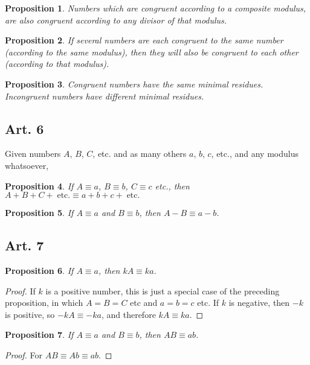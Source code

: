 \documentclass{book}
\theoremstyle{plain}
\newtheorem{proposition}{Proposition}
\theoremstyle{remark}
\begin{document}
\begin{proposition} Numbers which are congruent according to a composite modulus, are also congruent according to any divisor of that modulus. \end{proposition}

\begin{proposition} If several numbers are each congruent to the same number (according to the same modulus), then they will also be congruent to each other (according to that modulus). \end{proposition}

\begin{proposition}  Congruent numbers have the same minimal residues.  Incongruent numbers have different minimal residues. \end{proposition}

\subsection*{Art. 6} Given numbers $A$, $B$, $C$, etc. and as many others $a$, $b$, $c$, etc., and any modulus whatsoever, 
\begin{proposition} If  $A \equiv a$, $B \equiv b$, $C \equiv c$ etc.,  then $A + B + C + \;\mathrm{etc.} \equiv a+b+c+\;\mathrm{etc.} $ \end{proposition}
\begin{proposition}If  $A \equiv a$ and $B \equiv b$, then $ A - B  \equiv a-b $. \end{proposition}

\subsection*{Art. 7} 
\begin{proposition} If $A \equiv a$, then $kA \equiv ka $. \end{proposition}
\begin{proof}If $k$ is a positive number, this is just a special case of the preceding proposition, in which $A=B=C$ etc and $a=b=c$ etc.  If $k$ is negative, then $-k$ is positive, so $-kA \equiv -ka$, and therefore $kA \equiv ka$.\end{proof}
\begin{proposition}If $A \equiv a$ and $B \equiv b$, then $AB \equiv ab$.\end{proposition}\begin{proof} For $AB \equiv Ab \equiv ab$. \end{proof}
\end{document}
